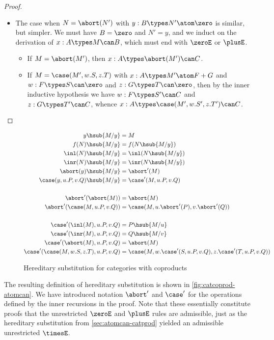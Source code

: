 \begin{proof}
\begin{enumerate}
\begin{itemize}
    \item The case when $N=\abort(N')$ with $y:B\types N'\atom\zero$ is similar, but simpler.
      We must have $B=\zero$ and $N'=y$, and we induct on the derivation of $x:A\types M\can B$, which must end with $\zeroE$ or $\plusE$.
      \begin{itemize}
      \item If $M=\abort(M')$, then $x:A\types \abort(M')\can C$.
      \item If $M=\case(M',w.S,z.T)$ with $x:A\types M'\atom F+G$ and $w:F\types S\can \zero$ and $z:G\types T\can \zero$, then
        by the inner inductive hypothesis we have $w:F\types S'\can C$ and $z:G\types T'\can C$, whence $x:A \types \case(M',w.S',z.T')\can C$.\qedhere
      \end{itemize}
    \end{itemize}
  \end{enumerate}
\end{proof}

\begin{figure}
  \centering
  \begin{align*}
    y\hsub{M/y} &= M\\
    f(N)\hsub{M/y} &= f(N\hsub{M/y})\\
    \inl(N)\hsub{M/y} &= \inl(N\hsub{M/y})\\
    \inr(N)\hsub{M/y} &= \inr(N\hsub{M/y})\\
    \abort(y)\hsub{M/y} &= \abort'(M)\\
    \case(y,u.P,v.Q)\hsub{M/y} &= \case'(M,u.P,v.Q)\\
    \\
    \abort'(\abort(M)) &= \abort(M)\\
    \abort'(\case(M,u.P,v.Q)) &= \case(M,u.\abort'(P),v.\abort'(Q))\\
    \\
    \case'(\inl(M),u.P,v.Q) &= P\hsub{M/u}\\
    \case'(\inr(M),u.P,v.Q) &= Q\hsub{M/v}\\
    \case'(\abort(M),u.P,v.Q) &= \abort(M)\\
    \case'(\case(M,w.S,z.T),u.P,v.Q) &= \case(M,w.\case'(S,u.P,v.Q),z.\case'(T,u.P,v.Q))
  \end{align*}
  \caption{Hereditary substitution for categories with coproducts}
  \label{fig:catcoprod-hsub}
\end{figure}

The resulting definition of hereditary substitution is shown in \cref{fig:catcoprod-atomcan}.
We have introduced notation $\abort'$ and $\case'$ for the operations defined by the inner recursions in the proof.
Note that these essentially constitute proofs that the unrestricted $\zeroE$ and $\plusE$ rules are admissible, just as the hereditary substitution from \cref{sec:atomcan-catprod} yielded an admissible unrestricted $\timesE$.

